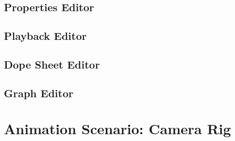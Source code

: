 \documentclass{article}
\begin{document}
\subsection{Properties Editor}

\subsection{Playback Editor}

\subsection{Dope Sheet Editor}

\subsection{Graph Editor}

\section{Animation Scenario: Camera Rig}
\end{document}
